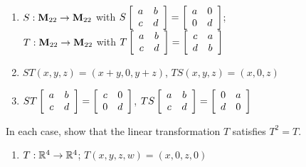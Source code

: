 \begin{multicols}{2}
\begin{ex}
\begin{enumerate}[label={\alph*.}]
\item $S : \textbf{M}_{22} \to \textbf{M}_{22}$ with $S\left[ \begin{array}{cc}
a & b \\
c & d
\end{array} \right] = \left[ \begin{array}{cc}
a & 0 \\
0 & d
\end{array} \right]$; \\
$T : \textbf{M}_{22} \to \textbf{M}_{22}$ with $T\left[ \begin{array}{cc}
a & b \\
c & d
\end{array} \right] = \left[ \begin{array}{cc}
c & a \\
d & b
\end{array} \right]$


\end{enumerate}
\begin{sol}
\begin{enumerate}[label={\alph*.}]
\setcounter{enumi}{1}
\item $ST(x, y, z) = (x + y, 0, y + z)$, $TS(x, y, z) = (x, 0, z)$

\setcounter{enumi}{3}
\item $ST\left[ \begin{array}{cc}
	a & b \\
	c & d
\end{array} \right] = \left[ \begin{array}{cc}
c & 0 \\
0 & d
\end{array} \right]$, $TS\left[ \begin{array}{cc}
a & b \\
c & d
\end{array} \right] = \left[ \begin{array}{cc}
0 & a \\
d & 0
\end{array} \right]$

\end{enumerate}
\end{sol}
\end{ex}

\begin{ex}
In each case, show that the linear transformation $T$ satisfies $T^{2} = T$.


\begin{enumerate}[label={\alph*.}]
\item $T : \mathbb{R}^4 \to \mathbb{R}^4$; $T(x, y, z, w) = (x, 0, z, 0)$


\end{enumerate}
\end{ex}
\end{multicols}
